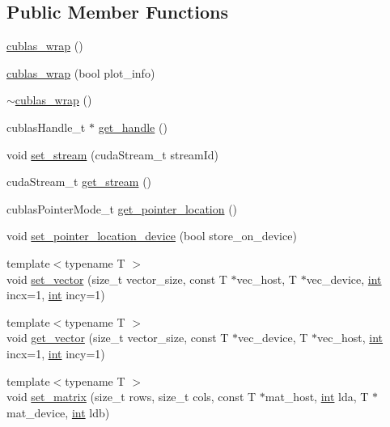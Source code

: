 \subsection*{Public Member Functions}
\begin{DoxyCompactItemize}
\item 
\hyperlink{classcublas__wrap_a6d24706f3f3f340f026ba6bbd0f74a01}{cublas\-\_\-wrap} ()
\item 
\hyperlink{classcublas__wrap_a982b3683950489cc364896d784d4d294}{cublas\-\_\-wrap} (bool plot\-\_\-info)
\item 
\hyperlink{classcublas__wrap_a6a431978633abedb3711de08b0599147}{$\sim$cublas\-\_\-wrap} ()
\item 
cublas\-Handle\-\_\-t $\ast$ \hyperlink{classcublas__wrap_ad5f08814a54b95e88feac00c4901a6e7}{get\-\_\-handle} ()
\item 
void \hyperlink{classcublas__wrap_ab2d24387228174ca90b44a9370a480ae}{set\-\_\-stream} (cuda\-Stream\-\_\-t stream\-Id)
\item 
cuda\-Stream\-\_\-t \hyperlink{classcublas__wrap_aea837f42bfbff51efe8f87bcd012bc0f}{get\-\_\-stream} ()
\item 
cublas\-Pointer\-Mode\-\_\-t \hyperlink{classcublas__wrap_ac0817996d33b80092a321b83deabd4c3}{get\-\_\-pointer\-\_\-location} ()
\item 
void \hyperlink{classcublas__wrap_a392f7835ba5b213cafb49c27bf384dca}{set\-\_\-pointer\-\_\-location\-\_\-device} (bool store\-\_\-on\-\_\-device)
\item 
{\footnotesize template$<$typename T $>$ }\\void \hyperlink{classcublas__wrap_a2bcf4397be6d916f72f92a8cf17a10be}{set\-\_\-vector} (size\-\_\-t vector\-\_\-size, const T $\ast$vec\-\_\-host, T $\ast$vec\-\_\-device, \hyperlink{classint}{int} incx=1, \hyperlink{classint}{int} incy=1)
\item 
{\footnotesize template$<$typename T $>$ }\\void \hyperlink{classcublas__wrap_af59e9d210292f895e3f7f1c7ad54ba01}{get\-\_\-vector} (size\-\_\-t vector\-\_\-size, const T $\ast$vec\-\_\-device, T $\ast$vec\-\_\-host, \hyperlink{classint}{int} incx=1, \hyperlink{classint}{int} incy=1)
\item 
{\footnotesize template$<$typename T $>$ }\\void \hyperlink{classcublas__wrap_ab1f5cde8f79bb7e55c9f3ae18a45e1f0}{set\-\_\-matrix} (size\-\_\-t rows, size\-\_\-t cols, const T $\ast$mat\-\_\-host, \hyperlink{classint}{int} lda, T $\ast$mat\-\_\-device, \hyperlink{classint}{int} ldb)

\end{DoxyCompactItemize}
